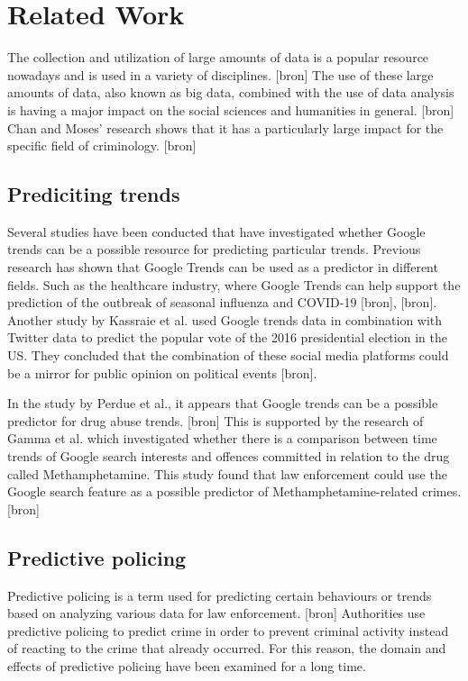 \section{Related Work}

The collection and utilization of large amounts of data is a popular resource nowadays and is used in a variety of disciplines. [bron] The use of these large amounts of data, also known as big data, combined with the use of data analysis is having a major impact on the social sciences and humanities in general. [bron] Chan and Moses' research shows that it has a particularly large impact for the specific field of criminology. [bron] 

\subsection{Prediciting trends}

Several studies have been conducted that have investigated whether Google trends can be a possible resource for predicting particular trends. Previous research has shown that Google Trends can be used as a predictor in different fields. Such as the healthcare industry, where Google Trends can help support the prediction of the outbreak of seasonal influenza and COVID-19 [bron], [bron]. Another study by Kassraie et al. used Google trends data in combination with Twitter data to predict the popular vote of the 2016 presidential election in the US. They concluded that the combination of these social media platforms could be a mirror for public opinion on political events [bron].

In the study by Perdue et al., it appears that Google trends can be a possible predictor for drug abuse trends. [bron] This is supported by the research of Gamma et al. which investigated whether there is a comparison between time trends of Google search interests and offences committed in relation to the drug called Methamphetamine. This study found that law enforcement could use the Google search feature as a possible predictor of Methamphetamine-related crimes. [bron]

\subsection{Predictive policing}

Predictive policing is a term used for predicting certain behaviours or trends based on analyzing various data for law enforcement. [bron] Authorities use predictive policing to predict crime in order to prevent criminal activity instead of reacting to the crime that already occurred. For this reason, the domain and effects of predictive policing have been examined for a long time. 


